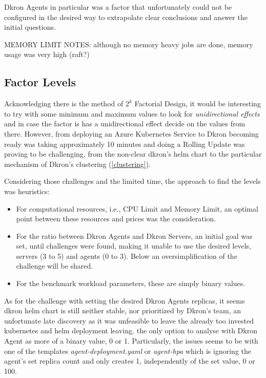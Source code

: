 \documentclass[runningheads]{llncs}
\begin{document}
Dkron Agents in particular was a factor that unfortunately could not be configured in the
desired way to extrapolate clear conclusions and answer the initial questions.


MEMORY LIMIT NOTES: although no memory heavy jobs are done, memory usage was very high (raft?)

\subsection{Factor Levels}
Acknowledging there is the method of $2^k$ Factorial Design, it would be interesting to
try with some minimum and maximum values to look for \textit{unidirectional effects} and
in case the factor is has a unidirectional effect decide on the values from there. However,
from deploying an Azure Kubernetes Service to Dkron becoming ready was taking approximately
10 minutes and doing a Rolling Update was proving to be challenging, from the non-clear dkron's
helm chart to the particular mechanism of Dkron's clustering (\ref{clustering}).

Considering those challenges and the limited time, the approach to find the levels was heuristics:
\begin{itemize}
    \item For computational resources, i.e., CPU Limit and Memory Limit, an optimal point between
    these resources and prices was the consideration.
    \item For the ratio between Dkron Agents and Dkron Servers, an initial goal was set, until
    challenges were found, making it unable to use the desired levels, servers (3 to 5) and agents (0 to 3).
    Below an oversimplification of the challenge will be shared.
    \item For the benchmark workload parameters, these are simply binary values.
\end{itemize}

As for the challenge with setting the desired Dkron Agents replicas, it seems dkron helm chart
is still neither stable, nor prioritized by Dkron's team, an unfortunate late discovery
as it was unfeasible to leave the already too invested kubernetes and helm deployment leaving.
the only option to analyse with Dkron Agent as more of a binary value, 0 or 1.
Particularly, the issues seems to be with one of the templates \textit{agent-deployment.yaml} or
\textit{agent-hpa} which is ignoring the agent's set replica count and only creates 1,
independently of the set value, 0 or 100.
\end{document}
